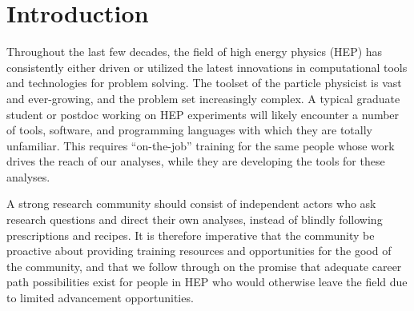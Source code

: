 \documentclass[12pt,a4paper]{article}
\begin{document}
%
%
%
%



\section{Introduction}

Throughout the last few decades, the field of high energy physics (HEP) has
consistently either driven or utilized the latest innovations in computational
tools and technologies for problem solving.
The toolset of the particle physicist is vast and ever-growing, and the problem
set increasingly complex.
A typical graduate student or postdoc working on HEP experiments will likely
encounter a number of tools, software, and programming languages with which they
are totally unfamiliar.
This requires ``on-the-job'' training for the same people whose work drives the
reach of our analyses, while they are developing the tools for these analyses.

A strong research community should consist of independent actors who ask
research questions and direct their own analyses, instead of blindly following
prescriptions and recipes. It is therefore imperative that the community be
proactive about providing training resources and opportunities for the good of
the community, and that we follow through on the promise that adequate career
path possibilities exist for people in HEP who would otherwise leave the field
due to limited advancement opportunities.
\end{document}
